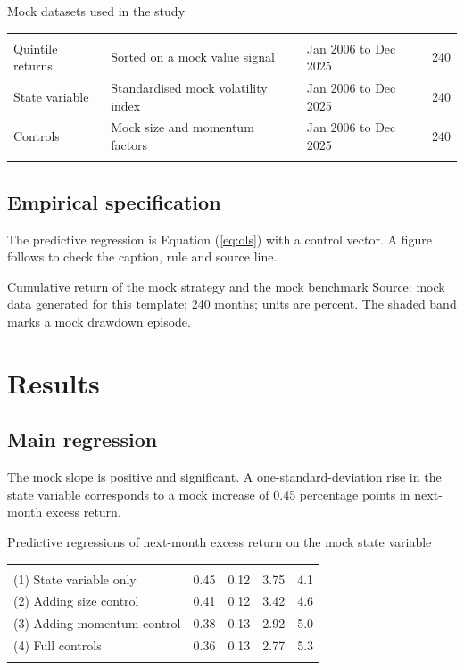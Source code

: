 \documentclass{lrreview}
\begin{document}
\begin{lrtable}{Mock datasets used in the study}\label{tab:data}
\begin{tabularx}{\linewidth}{@{}L L L r@{}}
\lrtoprule
{} &  &  & \\
\lrheadrule
Quintile returns & Sorted on a mock value signal & Jan 2006 to Dec 2025 & 240\\
\lrrowrule
State variable & Standardised mock volatility index & Jan 2006 to Dec 2025 & 240\\
\lrrowrule
Controls & Mock size and momentum factors & Jan 2006 to Dec 2025 & 240\\
\lrbottomrule
\end{tabularx}
\end{lrtable}

\subsection{Empirical specification}
 The predictive regression is Equation (\ref{eq:ols}) with a control vector.
A figure follows to check the caption, rule and source line.

  {Cumulative return of the mock strategy and the mock benchmark}
  {Source: mock data generated for this template; 240 months; units are percent. The shaded band marks a mock drawdown episode.}

\section{Results}

\subsection{Main regression}
 The mock slope is positive and significant. A one-standard-deviation
rise in the state variable corresponds to a mock increase of 0.45 percentage
points in next-month excess return.

\begin{lrtable}{Predictive regressions of next-month excess return on the mock state variable}
\begin{tabularx}{\linewidth}{@{}L r r r r@{}}
\lrtoprule
{} &  &  &  & \\
\lrheadrule
(1) State variable only & 0.45 & 0.12 & 3.75 & 4.1\\
\lrrowrule
(2) Adding size control & 0.41 & 0.12 & 3.42 & 4.6\\
\lrrowrule
(3) Adding momentum control & 0.38 & 0.13 & 2.92 & 5.0\\
\lrrowrule
(4) Full controls & 0.36 & 0.13 & 2.77 & 5.3\\
\lrbottomrule
\end{tabularx}
\end{lrtable}
\end{document}
